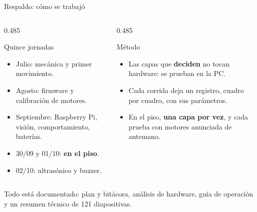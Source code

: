 \documentclass[aspectratio=169,11pt]{beamer}
\begin{document}
\begin{frame}{Respaldo: cómo se trabajó}
  \small
  \begin{columns}[T,onlytextwidth]
    \begin{column}{0.485\textwidth}
      \begin{block}{Quince jornadas}
        \begin{itemize}
          \item Julio: mecánica y primer movimiento.
          \item Agosto: firmware y calibración de motores.
          \item Septiembre: Raspberry Pi, visión, comportamiento, baterías.
          \item 30/09 y 01/10: \textbf{en el piso}.
          \item 02/10: ultrasónico y buzzer.
        \end{itemize}
      \end{block}
    \end{column}
    \begin{column}{0.485\textwidth}
      \begin{block}{Método}
        \begin{itemize}
          \item Las capas que \textbf{deciden} no tocan hardware: se prueban
                en la PC.
          \item Cada corrida deja un registro, cuadro por cuadro, con sus
                parámetros.
          \item En el piso, \textbf{una capa por vez}, y cada prueba con
                motores anunciada de antemano.
        \end{itemize}
      \end{block}
    \end{column}
  \end{columns}

  \vspace{0.5em}
  Todo está documentado: plan y bitácora, análisis de hardware, guía de
  operación y un resumen técnico de 121 diapositivas.
\end{frame}

\setcounter{framenumber}{\value{ultimaprincipal}}
\end{document}
